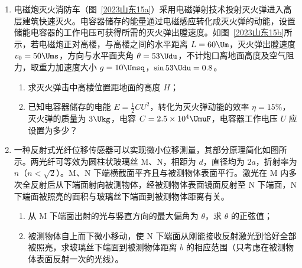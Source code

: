 \documentclass[\gkver]{gaokaozhenti}
\begin{document}
\begin{enumerate}
\item
电磁炮灭火消防车（图~\ref{2023山东15a}）采用电磁弹射技术投射灭火弹进入高层建筑快速灭火。电容器储存的能量通过电磁感应转化成灭火弹的动能，设置储能电容器的工作电压可获得所需的灭火弹出膛速度。如图~\ref{2023山东15b}所示，若电磁炮正对高楼，与高楼之间的水平距离 $L = 60 \Um$，灭火弹出膛速度 $v_{0} = 50 \Ums$，方向与水平面夹角 $\theta = 53\Udu$，不计炮口离地面高度及空气阻力，取重力加速度大小 $g = 10 \Umsq$，$\sin 53\Udu = 0.8$。
\begin{enumerate}
	\item
	求灭火弹击中高楼位置距地面的高度 $H$；
	\item
	已知电容器储存的电能 $E = \frac{1}{2}CU^{2}$，转化为灭火弹动能的效率 $\eta = 15\%$，灭火弹的质量为 $3 \Ukg$，电容 $C = 2.5\times10^{4} \UmuF$，电容器工作电压 $U$ 应设置为多少？
\end{enumerate}



\item
一种反射式光纤位移传感器可以实现微小位移测量，其部分原理简化如图所示。两光纤可等效为圆柱状玻璃丝 M、N，相距为 $d$，直径均为 $2a$，折射率为 $n$（$n < \sqrt{2}$）。M、N 下端横截面平齐且与被测物体表面平行。激光在 M 内多次全反射后从下端面射向被测物体，经被测物体表面镜面反射至 N 下端面，N 下端面被照亮的面积与玻璃丝下端面到被测物体距离有关。
\begin{enumerate}
	\item
	从 M 下端面出射的光与竖直方向的最大偏角为 $\theta$，求 $\theta$ 的正弦值；
	\item
	被测物体自上而下微小移动，使 N 下端面从刚能接收反射激光到恰好全部被照亮，求玻璃丝下端面到被测物体距离 $b$ 的相应范围（只考虑在被测物体表面反射一次的光线）。
\end{enumerate}


\end{enumerate}
\end{document}
